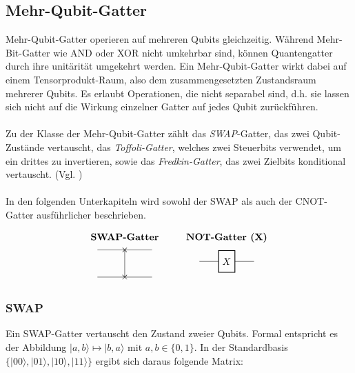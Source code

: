 \subsection{Mehr-Qubit-Gatter}
Mehr-Qubit-Gatter operieren auf mehreren Qubits gleichzeitig. Während Mehr-Bit-Gatter wie AND oder XOR nicht umkehrbar sind, können Quantengatter durch ihre unitärität umgekehrt werden. Ein Mehr-Qubit-Gatter wirkt dabei auf einem Tensorprodukt-Raum, also dem zusammengesetzten Zustandsraum mehrerer Qubits. Es erlaubt Operationen, die nicht separabel sind, d.h. sie lassen sich nicht auf die Wirkung einzelner Gatter auf jedes Qubit zurückführen.\\
\\
Zu der Klasse der Mehr-Qubit-Gatter zählt das \emph{SWAP}-Gatter, das zwei Qubit-Zustände vertauscht, das \emph{Toffoli-Gatter}, welches zwei Steuerbits verwendet, um ein drittes zu invertieren, sowie das \emph{Fredkin-Gatter}, das zwei Zielbits konditional vertauscht. (Vgl. \cite[S.29, 156f.]{nielsen_quantum_2010})\\
\\
In den folgenden Unterkapiteln wird sowohl der SWAP als auch der CNOT-Gatter ausführlicher beschrieben.

\newcommand{\gatterbox}[1]{%
  \tikz[baseline=-0.5ex]{
    \draw[-] (-1,0) -- (-0.3,0);
    \draw[thick] (-0.3,-0.4) rectangle (0.3,0.4);
    \node at (0,0) {\( #1 \)};
    \draw[-] (0.3,0) -- (1,0);
  }%
}

\newcommand{\swapgatter}{%
  \begin{tikzpicture}[baseline=(current bounding box.center)]
    \draw (-1,0.5) -- (1,0.5);
    \draw (-1,-0.5) -- (1,-0.5);
    \node at (0,0.5) {$\times$};
    \node at (0,-0.5) {$\times$};
    \draw (0,0.5) -- (0,-0.5);
  \end{tikzpicture}%
}

\[
\begin{array}{c@{\hspace{1cm}}c}
\textbf{SWAP-Gatter} & \textbf{NOT-Gatter (X)} \\
\swapgatter & \gatterbox{X}
\end{array}
\]




\subsubsection{SWAP}
Ein SWAP-Gatter vertauscht den Zustand zweier Qubits. Formal entspricht es der Abbildung $|a,b\rangle \mapsto |b,a\rangle$ mit $a,b \in \{0,1\}$. In der Standardbasis $\{|00\rangle, |01\rangle, |10\rangle, |11\rangle\}$ ergibt sich daraus folgende Matrix:


